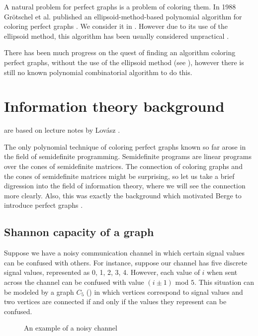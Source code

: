 A natural problem for perfect graphs is a problem of coloring them. In 1988 Gr\"otschel et al. published an ellipsoid-method-based polynomial algorithm for coloring perfect graphs \cite{Grtschel1993}. We consider it in . However due to its use of the ellipsoid method, this algorithm has been usually considered unpractical \cite{coloringSquareFree,Chudnovsky2003, coloringArtemis}.

There has been much progress on the quest of finding an algorithm coloring perfect graphs, without the use of the ellipsoid method (see ), however there is still no known polynomial combinatorial algorithm to do this.

\section{Information theory background}
\label{sec:InformationTheory}

 are based on lecture notes by Lovász \cite{Lovasz95}.

The only polynomial technique of coloring perfect graphs known so far arose in the field of semidefinite programming. Semidefinite programs are linear programs over the cones of semidefinite matrices. The connection of coloring graphs and the cones of semidefinite matrices might be surprising, so let us take a brief digression into the field of information theory, where we will see the connection more clearly. Also, this was exactly the background which motivated Berge to introduce perfect graphs \cite{Chudnovsky2003}.

\subsection{Shannon capacity of a graph}
\label{sec:ShannonCapacity}

Suppose we have a noisy communication channel in which certain signal values can be confused with others. For instance, suppose our channel has five discrete signal values, represented as 0, 1, 2, 3, 4. However, each value of $i$ when sent across the channel can be confused with value $(i \pm 1)$ mod $5$. This situation can be modeled by a graph $C_5$ () in which vertices correspond to signal values and two vertices are connected if and only if the values they represent can be confused.

\begin{wrapfigure}{r}{0.35\textwidth}
  
  \caption{An example of a noisy channel}%
  \label{fig:c5}
\end{wrapfigure}

